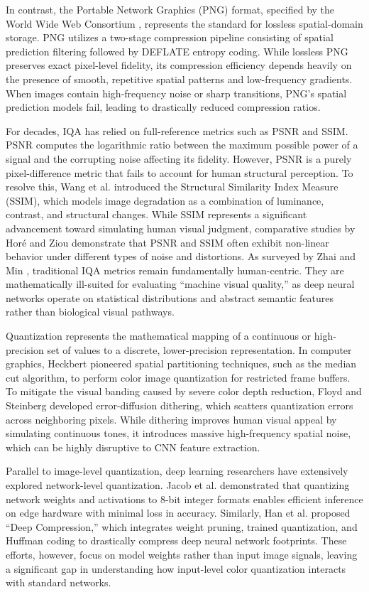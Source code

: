 \documentclass[12pt, a4paper]{article}
\begin{document}
In contrast, the Portable Network Graphics (PNG) format, specified by the World Wide Web Consortium \cite{w3c2003}, represents the standard for lossless spatial-domain storage. PNG utilizes a two-stage compression pipeline consisting of spatial prediction filtering followed by DEFLATE entropy coding. While lossless PNG preserves exact pixel-level fidelity, its compression efficiency depends heavily on the presence of smooth, repetitive spatial patterns and low-frequency gradients. When images contain high-frequency noise or sharp transitions, PNG's spatial prediction models fail, leading to drastically reduced compression ratios.

For decades, IQA has relied on full-reference metrics such as PSNR and SSIM. PSNR computes the logarithmic ratio between the maximum possible power of a signal and the corrupting noise affecting its fidelity. However, PSNR is a purely pixel-difference metric that fails to account for human structural perception. To resolve this, Wang et al. \cite{wang2004} introduced the Structural Similarity Index Measure (SSIM), which models image degradation as a combination of luminance, contrast, and structural changes. While SSIM represents a significant advancement toward simulating human visual judgment, comparative studies by Horé and Ziou \cite{hore2010} demonstrate that PSNR and SSIM often exhibit non-linear behavior under different types of noise and distortions. As surveyed by Zhai and Min \cite{zhai2020}, traditional IQA metrics remain fundamentally human-centric. They are mathematically ill-suited for evaluating ``machine visual quality,'' as deep neural networks operate on statistical distributions and abstract semantic features rather than biological visual pathways.

Quantization represents the mathematical mapping of a continuous or high-precision set of values to a discrete, lower-precision representation. In computer graphics, Heckbert \cite{heckbert1982} pioneered spatial partitioning techniques, such as the median cut algorithm, to perform color image quantization for restricted frame buffers. To mitigate the visual banding caused by severe color depth reduction, Floyd and Steinberg \cite{floyd1976} developed error-diffusion dithering, which scatters quantization errors across neighboring pixels. While dithering improves human visual appeal by simulating continuous tones, it introduces massive high-frequency spatial noise, which can be highly disruptive to CNN feature extraction.

Parallel to image-level quantization, deep learning researchers have extensively explored network-level quantization. Jacob et al. \cite{jacob2018} demonstrated that quantizing network weights and activations to 8-bit integer formats enables efficient inference on edge hardware with minimal loss in accuracy. Similarly, Han et al. \cite{han2016} proposed ``Deep Compression,'' which integrates weight pruning, trained quantization, and Huffman coding to drastically compress deep neural network footprints. These efforts, however, focus on model weights rather than input image signals, leaving a significant gap in understanding how input-level color quantization interacts with standard networks.
\end{document}
